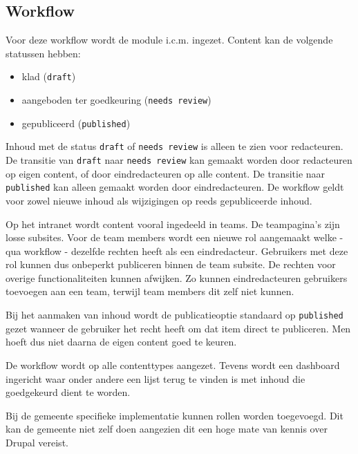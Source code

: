 \subsection{Workflow}\label{workflow}
Voor deze workflow wordt de  module i.c.m.  ingezet. Content kan de volgende statussen hebben:
\begin{itemize}
\item klad (\texttt{draft})
\item aangeboden ter goedkeuring (\texttt{needs review})
\item gepubliceerd (\texttt{published})
\end{itemize}
Inhoud met de status \texttt{draft} of \texttt{needs review} is alleen te zien voor redacteuren. De transitie van \texttt{draft} naar \texttt{needs review} kan gemaakt worden door redacteuren op eigen content, of door eindredacteuren op alle content. De transitie naar \texttt{published} kan alleen gemaakt worden door eindredacteuren. De workflow geldt voor zowel nieuwe inhoud als wijzigingen op reeds gepubliceerde inhoud.

Op het intranet wordt content vooral ingedeeld in teams. De teampagina's zijn losse subsites. Voor de team members wordt een nieuwe rol aangemaakt welke - qua workflow - dezelfde rechten heeft als een eindredacteur. Gebruikers met deze rol kunnen dus onbeperkt publiceren binnen de team subsite. De rechten voor overige functionaliteiten kunnen afwijken. Zo kunnen eindredacteuren gebruikers toevoegen aan een team, terwijl team members dit zelf niet kunnen.

Bij het aanmaken van inhoud wordt de publicatieoptie standaard op \texttt{published} gezet wanneer de gebruiker het recht heeft om dat item direct te publiceren. Men hoeft dus niet daarna de eigen content goed te keuren.

De workflow wordt op alle contenttypes aangezet. Tevens wordt een dashboard ingericht waar onder andere een lijst terug te vinden is met inhoud die goedgekeurd dient te worden.

Bij de gemeente specifieke implementatie kunnen rollen worden toegevoegd. Dit kan de gemeente niet zelf doen aangezien dit een hoge mate van kennis over Drupal vereist.


